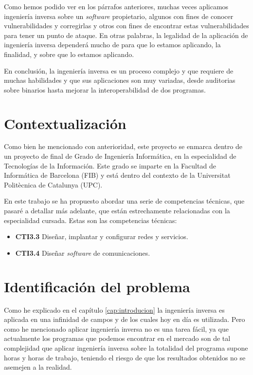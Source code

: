 Como hemos podido ver en los párrafos anteriores, muchas veces aplicamos ingeniería inversa sobre un \textit{software} propietario, algunos con fines de conocer vulnerabilidades y corregirlas
y otros con fines de encontrar estas vulnerabilidades para tener un punto de ataque. En otras palabras, la legalidad de la aplicación de ingeniería inversa dependerá mucho de para
que lo estamos aplicando, la finalidad, y sobre que lo estamos aplicando.

En conclusión, la ingeniería inversa es un proceso complejo y que requiere de muchas habilidades y que sus aplicaciones son muy variadas, desde auditorias sobre binarios hasta mejorar
la interoperabilidad de dos programas.

\section{Contextualización}
\label{sec:contextualizacion}


Como bien he mencionado con anterioridad, este proyecto se enmarca dentro de un proyecto de final de Grado de Ingeniería Informática, en la especialidad de Tecnologías de la Información.
Este grado se imparte en la Facultad de Informática de Barcelona (FIB) y está dentro del contexto de la Universitat Politècnica de Catalunya (UPC).

En este trabajo se ha propuesto abordar una serie de competencias técnicas, que pasaré a detallar más adelante, que están estrechamente relacionadas con la especialidad cursada. Estas
son las competencias técnicas:

\begin{itemize}
    \item \textbf{CTI3.3} Diseñar, implantar y configurar redes y servicios.
    \item \textbf{CTI3.4} Diseñar \textit{software} de comunicaciones.
\end{itemize}

\section{Identificación del problema}
\label{sec:problema}


Como he explicado en el capítulo \ref{cap:introducion} la ingeniería inversa es aplicada en una infinidad de campos y de los cuales hoy en día es utilizada. Pero como he mencionado
aplicar ingeniería inversa no es una tarea fácil, ya que actualmente los programas que podemos encontrar en el mercado son de tal complejidad que aplicar ingeniería inversa sobre la
totalidad del programa supone horas y horas de trabajo, teniendo el riesgo de que los resultados obtenidos no se asemejen a la realidad.

